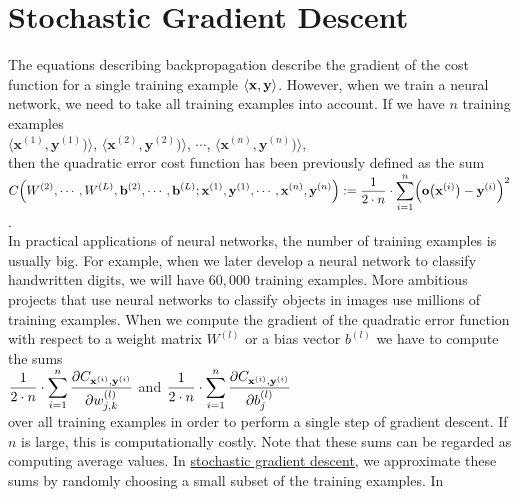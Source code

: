 \section{Stochastic Gradient Descent}
The equations describing backpropagation describe the gradient of the cost function for a single training
example $\pair(\mathbf{x}, \mathbf{y})$.  However, when we train a neural network, we need to take all training
examples into account.  If we have $n$ training examples
\\[0.2cm]
\hspace*{1.3cm}
$\langle\mathbf{x}^{(1)}, \mathbf{y}^{(1)})\rangle$,
$\langle\mathbf{x}^{(2)}, \mathbf{y}^{(2)})\rangle$,
$\cdots$,
$\langle\mathbf{x}^{(n)}, \mathbf{y}^{(n)})\rangle$,
\\[0.2cm]
then the quadratic error cost function has been previously defined as the sum
\\[0.2cm]
\hspace*{1.3cm}
$\displaystyle C\Bigr(W^{(2)}, \cdots, W^{(L)}, \mathbf{b}^{(2)}, \cdots, \mathbf{b}^{(L)};
     \mathbf{x}^{(1)}, \mathbf{y}^{(1)}, \cdots, \mathbf{x}^{(n)},\mathbf{y}^{(n)} \Bigr) := 
 \frac{1}{2 \cdot n} \cdot \sum\limits_{i=1}^n \Bigl(\mathbf{o}\bigl(\mathbf{x}^{(i)}\bigr) - \mathbf{y}^{(i)}\Bigr)^2
$.
\\[0.2cm]
In practical applications of neural networks, the number of training examples is usually big.  For example, 
when we later develop a neural network to classify handwritten digits, we will have $60,000$ training examples.  More
ambitious projects that use neural networks to classify objects in images use millions of training examples.
When we compute the gradient of the quadratic error function with respect to a weight matrix $W^{(l)}$ or a
bias vector $b^{(l)}$ we have to compute the sums 
\\[0.2cm]
\hspace*{1.3cm}
$\displaystyle \frac{1}{2\cdot n} \cdot \sum\limits_{i=1}^n \frac{\partial C_{\mathbf{x}^{(i)}, \mathbf{y}^{(i)}}}{\partial w_{j,k}^{(l)}}$
\quad and \quad
$\displaystyle \frac{1}{2\cdot n} \cdot \sum\limits_{i=1}^n \frac{\partial C_{\mathbf{x}^{(i)}, \mathbf{y}^{(i)}}}{\partial b_{j}^{(l)}}$
\\[0.2cm]
over all training examples in order to perform a single step of gradient descent.  If $n$ is large, this is
computationally costly.  Note that these sums can be regarded as computing average values.  In 
\href{https://en.wikipedia.org/wiki/Stochastic_gradient_descent}{stochastic gradient descent}, 
we approximate these sums by randomly choosing a small subset of the training examples.  In

